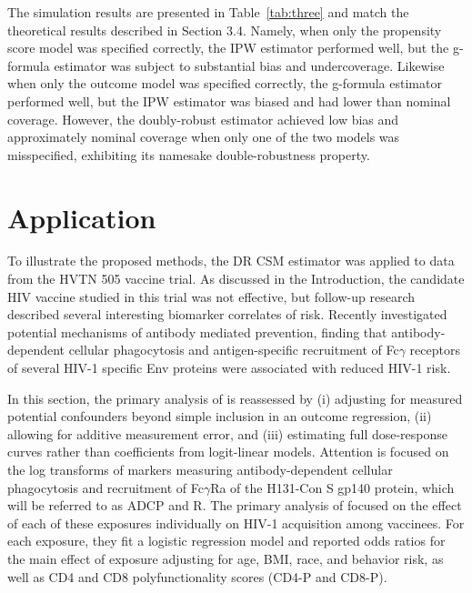 \documentclass[useAMS,usenatbib,referee]{biom}
\newcommand{\RNum}[1]{\uppercase\expandafter{\romannumeral #1\relax}}
\begin{document}
The simulation results are presented in Table~\ref{tab:three} and match the theoretical results described in Section 3.4. Namely, when only the propensity score model was specified correctly, the IPW estimator performed well, but the g-formula estimator was subject to substantial bias and undercoverage. Likewise when only the outcome model was specified correctly, the g-formula estimator performed well, but the IPW estimator was biased and had lower than nominal coverage. However, the doubly-robust estimator achieved low bias and approximately nominal coverage when only one of the two models was misspecified, exhibiting its namesake double-robustness property.

\section{Application}

To illustrate the proposed methods, the DR CSM estimator was applied to data from the HVTN 505 vaccine trial. As discussed in the Introduction, the candidate HIV vaccine studied in this trial was not effective, but follow-up research described several interesting biomarker correlates of risk. Recently \citet{neidich2019} investigated potential mechanisms of antibody mediated prevention, finding that antibody-dependent cellular phagocytosis and antigen-specific recruitment of Fc$\gamma$ receptors of several HIV-1 specific Env proteins were associated with reduced HIV-1 risk.

In this section, the primary analysis of \citet{neidich2019} is reassessed by (i) adjusting for measured potential confounders beyond simple inclusion in an outcome regression, (ii) allowing for additive measurement error, and (iii) estimating full dose-response curves rather than coefficients from logit-linear models. Attention is focused on the log transforms of markers measuring antibody-dependent cellular phagocytosis and recruitment of Fc$\gamma$R\RNum{2}a of the H131-Con S gp140 protein, which will be referred to as ADCP and R\RNum{2}. The primary analysis of \citet{neidich2019} focused on the effect of each of these exposures individually on HIV-1 acquisition among vaccinees. For each exposure, they fit a logistic regression model and reported odds ratios for the main effect of exposure adjusting for age, BMI, race, and behavior risk, as well as CD4 and CD8 polyfunctionality scores (CD4-P and CD8-P).
\end{document}
